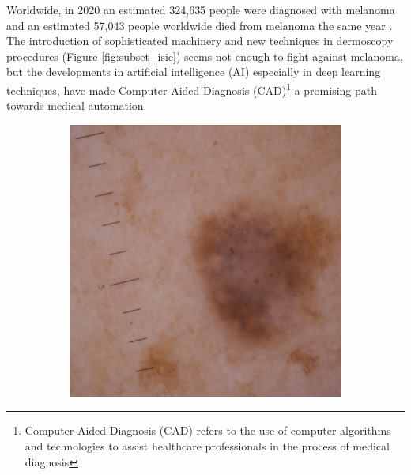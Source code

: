 Worldwide, in 2020 an estimated 324,635 people were diagnosed with melanoma and
an estimated 57,043 people worldwide died from melanoma the same year
\cite{CancerStats}. The introduction of sophisticated machinery and new
techniques in dermoscopy procedures (Figure \ref{fig:subset_isic}) seems not
enough to fight against melanoma, but the developments in artificial
intelligence (AI) especially in deep learning techniques, have made
Computer-Aided Diagnosis (CAD)\footnote{Computer-Aided Diagnosis (CAD) refers
to the use of computer algorithms and technologies to assist healthcare
professionals in the process of medical diagnosis} a promising path towards
medical automation.

\begin{figure}[h!] \centering
  \begin{subfigure}{0.3\textwidth}
    \includegraphics[width=\textwidth]{imatges/introduction/subset_isic/ISIC_1752943.jpg}
  \end{subfigure}
  \hfill
  \begin{subfigure}{0.3\textwidth}

\end{subfigure}
\end{figure}
